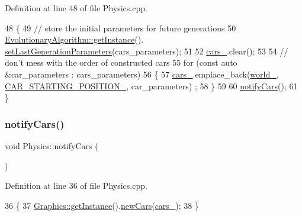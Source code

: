 Definition at line 48 of file Physics.\+cpp.


\begin{DoxyCode}
48                                                                       \{
49     \textcolor{comment}{// store the initial parameters for future generations}
50     \hyperlink{classEvolutionaryAlgorithm_a306ea15ca9a4eb67b84d22c7b24ef659}{EvolutionaryAlgorithm::getInstance}().
      \hyperlink{classEvolutionaryAlgorithm_accd59515cc111edb66a030e7f8d79099}{setLastGenerationParameters}(cars\_parameters);
51 
52     \hyperlink{classPhysics_ad798f52a18a2e5975f349b1fd95ceefc}{cars\_}.clear();
53 
54     \textcolor{comment}{// don't mess with the order of constructed cars}
55     \textcolor{keywordflow}{for} (\textcolor{keyword}{const} \textcolor{keyword}{auto} &car\_parameters : cars\_parameters)
56     \{
57         \hyperlink{classPhysics_ad798f52a18a2e5975f349b1fd95ceefc}{cars\_}.emplace\_back(\hyperlink{classPhysics_a6f9efee327d116528efb9fd16b405bc6}{world\_}, \hyperlink{classPhysics_a960c795e535acff932299971c93aa166}{CAR\_STARTING\_POSITION\_}, car\_parameters)
      ;
58     \}
59 
60     \hyperlink{classPhysics_a466b0a9be955dcf7afd58afdd396a560}{notifyCars}();
61 \}
\end{DoxyCode}
\mbox{\label{classPhysics_a466b0a9be955dcf7afd58afdd396a560}} 
\subsubsection{\texorpdfstring{notify\+Cars()}{notifyCars()}}
{\footnotesize\ttfamily void Physics\+::notify\+Cars (\begin{DoxyParamCaption}{ }\end{DoxyParamCaption})}



Definition at line 36 of file Physics.\+cpp.


\begin{DoxyCode}
36                          \{
37     \hyperlink{classGraphics_a115d78c8686f6c82add227bf1fe2c81c}{Graphics::getInstance}().\hyperlink{classGraphics_aee9384443642037cef28b28acddf86d3}{newCars}(\hyperlink{classPhysics_ad798f52a18a2e5975f349b1fd95ceefc}{cars\_});
38 \}
\end{DoxyCode}
\mbox{\label{classPhysics_a5ec463e5f4ccd5830de8c85c2398caaf}} 
